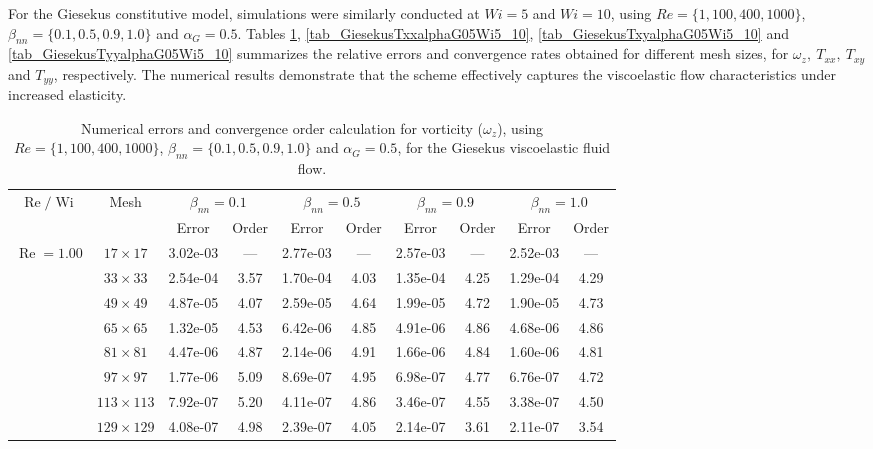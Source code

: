 \documentclass[preprint, 12pt]{elsarticle}
\begin{document}
For the Giesekus constitutive model, simulations were similarly conducted at $Wi = 5$ and $Wi = 10$, using $Re=\{1,100,400,1000\}$, $\beta_{nn}=\{0.1,0.5,0.9,1.0\}$ and $\alpha_G = 0.5$. Tables \ref{tab_GiesekusWzalphaG05Wi5_10}, \ref{tab_GiesekusTxxalphaG05Wi5_10}, \ref{tab_GiesekusTxyalphaG05Wi5_10} and \ref{tab_GiesekusTyyalphaG05Wi5_10} summarizes the relative errors and convergence rates obtained for different mesh sizes, for $\omega_z,\ T_{xx},\ T_{xy}$ and $T_{yy}$, respectively. The numerical results demonstrate that the scheme effectively captures the viscoelastic flow characteristics under increased elasticity.

\begin{center}
\begin{table}[H]
\caption{Numerical errors and convergence order calculation for vorticity ($\omega_{z}$), using $Re=\{1,100,400,1000\}$, $\beta_{nn}=\{0.1,0.5,0.9,1.0\}$ and $\alpha_G = 0.5$, for the Giesekus viscoelastic fluid flow.\label{tab_GiesekusWzalphaG05Wi5_10}}
\tiny{
    \begin{tabular*}{\textwidth}{@{\extracolsep\fill}cccccccccc@{}}
    \hline
    \multirow{2}{*}{$\operatorname{Re}/\operatorname{Wi}$} & \multirow{2}{*}{Mesh} & \multicolumn{2}{c}{$\beta_{nn}=0.1$}  & \multicolumn{2}{c}{$\beta_{nn}=0.5$}  & \multicolumn{2}{c}{$\beta_{nn}=0.9$}  & \multicolumn{2}{c}{$\beta_{nn}=1.0$}\\ %
     & & Error & Order & Error & Order & Error & Order & Error & Order \\
    \hline
    \multirow{7}{*}{$\operatorname{Re}=1.00$} & $17\times 17$ & 3.02e-03 & --- & 2.77e-03 & --- & 2.57e-03 & --- & 2.52e-03 & --- \\
& $33\times 33$ & 2.54e-04 & 3.57 & 1.70e-04 & 4.03 & 1.35e-04 & 4.25 & 1.29e-04 & 4.29 \\
& $49\times 49$ & 4.87e-05 & 4.07 & 2.59e-05 & 4.64 & 1.99e-05 & 4.72 & 1.90e-05 & 4.73 \\
\multirow{3}{*}{$\operatorname{Wi}=5$} & $65\times 65$ & 1.32e-05 & 4.53 & 6.42e-06 & 4.85 & 4.91e-06 & 4.86 & 4.68e-06 & 4.86 \\
& $81\times 81$ & 4.47e-06 & 4.87 & 2.14e-06 & 4.91 & 1.66e-06 & 4.84 & 1.60e-06 & 4.81 \\
& $97\times 97$ & 1.77e-06 & 5.09 & 8.69e-07 & 4.95 & 6.98e-07 & 4.77 & 6.76e-07 & 4.72 \\
& $113\times 113$ & 7.92e-07 & 5.20 & 4.11e-07 & 4.86 & 3.46e-07 & 4.55 & 3.38e-07 & 4.50 \\
& $129\times 129$ & 4.08e-07 & 4.98 & 2.39e-07 & 4.05 & 2.14e-07 & 3.61 & 2.11e-07 & 3.54 \\

\end{tabular*}}
\end{table}
\end{center}
\end{document}
